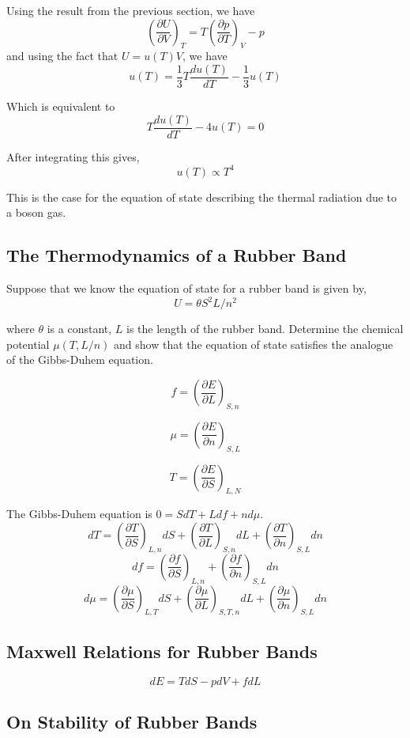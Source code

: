\documentclass[10pt,twoside,openright]{memoir}
\begin{document}
Using the result from the previous section, we have
$$
\left( \frac{\partial U}{\partial V} \right)_T = T \left( \frac{\partial p}{\partial T} \right)_V - p
$$
and using the fact that $U = u(T) V$, we have
$$
u(T) = \frac{1}{3}T \frac{du(T)}{dT} - \frac{1}{3}u(T)
$$

Which is equivalent to
$$
T \frac{du(T)}{dT} - 4u(T) = 0
$$

After integrating this gives,
$$
u(T) \propto T^4
$$

This is the case for the equation of state describing the thermal radiation due to a boson gas.

\subsection{The Thermodynamics of a Rubber Band}
Suppose that we know the equation of state for a rubber band is given by,
$$
U = \theta S^2 L / n^2
$$


where $\theta$ is a constant, $L$ is the length of the rubber band. Determine the chemical potential $\mu (T, L/n)$ and show that the equation of state satisfies the analogue of the Gibbs-Duhem equation.

$$
f = \left(  \frac{\partial E}{\partial L} \right)_{S,n}
$$

$$
\mu = \left(  \frac{\partial E}{\partial n} \right)_{S,L}
$$

$$
T = \left(  \frac{\partial E}{\partial S} \right)_{L,N}
$$
  
The Gibbs-Duhem equation is $0 = SdT + Ldf +  n d \mu$.
$$
dT = \left(  \frac{\partial T}{\partial S} \right)_{L,n} dS + \left(  \frac{\partial T}{\partial L} \right)_{S,n} dL +
\left(  \frac{\partial T}{\partial n} \right)_{S,L} dn
$$
$$
df = \left(  \frac{\partial f}{\partial S} \right)_{L,n} +
\left(  \frac{\partial f}{\partial n} \right)_{S,L} dn
$$
$$
d \mu = \left(  \frac{\partial \mu}{\partial S} \right)_{L,T} dS + \left(  \frac{\partial \mu}{\partial L} \right)_{S,T, n} dL + \left(  \frac{\partial \mu}{\partial n} \right)_{S,L} dn
$$

\subsection{Maxwell Relations for Rubber Bands}
$$
dE = TdS - pdV + fdL
$$



\subsection{On Stability of Rubber Bands}
\end{document}
